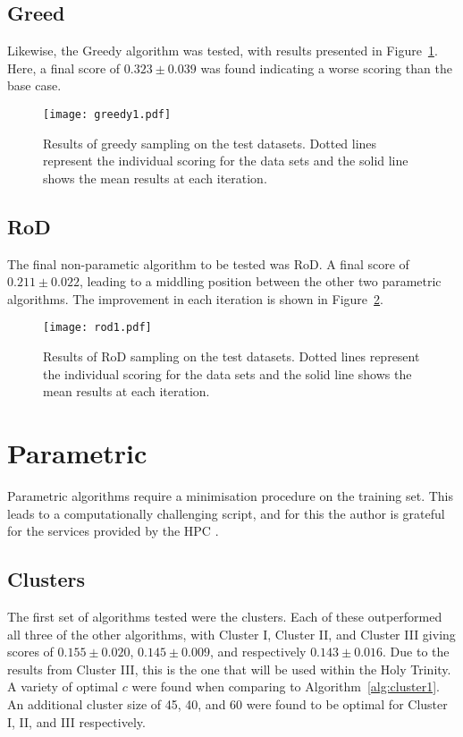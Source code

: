 \subsection{Greed}
Likewise, the Greedy algorithm was tested, with results presented in Figure~\ref{fig:GreedyTestSet}. Here, a final score of ${0.323\pm{}0.039}$ was found indicating a worse scoring than the base case.
\begin{figure}[H]
    \begin{center}
        \texttt{[image: greedy1.pdf]}
        \caption[Greedy]{Results of greedy sampling on the test datasets. Dotted lines represent the individual scoring for the data sets and the solid line shows the mean results at each iteration.}
        \label{fig:GreedyTestSet}
    \end{center}
\end{figure}

\subsection[Region of Disagreement]{RoD}
The final non-parametic algorithm to be tested was RoD. A final score of ${0.211\pm{}0.022}$, leading to a middling position between the other two parametric algorithms. The improvement in each iteration is shown in Figure~\ref{fig:RODTestSet}.

\begin{figure}[H]
    \begin{center}
        \texttt{[image: rod1.pdf]}
        \caption[RoD]{Results of RoD sampling on the test datasets. Dotted lines represent the individual scoring for the data sets and the solid line shows the mean results at each iteration.}
        \label{fig:RODTestSet}
    \end{center}
\end{figure}

\section{Parametric}
Parametric algorithms require a minimisation procedure on the training set. This leads to a computationally challenging script, and for this the author is grateful for the services provided by the HPC \cite{HPC}.

\subsection{Clusters}
The first set of algorithms tested were the clusters. Each of these outperformed all three of the other algorithms, with Cluster I, Cluster II, and Cluster III giving scores of ${0.155\pm{}0.020}$, ${0.145\pm{}0.009}$, and respectively ${0.143\pm{}0.016}$. Due to the results from Cluster III, this is the one that will be used within the Holy Trinity. A variety of optimal ${c}$ were found when comparing to Algorithm~\ref{alg:cluster1}. An additional cluster size of 45, 40, and 60 were found to be optimal for Cluster I, II, and III respectively.

